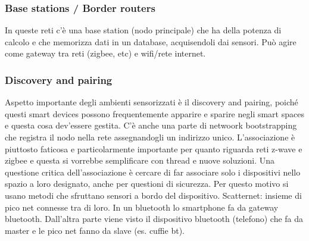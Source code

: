 \subsubsection{Base stations / Border routers}
In queste reti c'è una base station (nodo principale) che ha della potenza di calcolo e che memorizza dati in un database, acquisendoli dai sensori. Può agire come gateway tra reti (zigbee, etc) e wifi/rete internet.


\subsubsection{Discovery and pairing}
Aspetto importante degli ambienti sensorizzati è il discovery and pairing, poiché questi smart devices possono frequentemente apparire e sparire negli smart spaces e questa cosa dev'essere gestita. C'è anche una parte di netwoork bootstrapping che registra il nodo nella rete assegnandogli un indirizzo unico. L'associazione è piuttosto faticosa e particolarmente importante per quanto riguarda reti z-wave e zigbee e questa si vorrebbe semplificare con thread e nuove soluzioni. Una questione critica dell'associazione è cercare di far associare solo i dispositivi nello spazio a loro designato, anche per questioni di sicurezza. Per questo motivo si usano metodi che sfruttano sensori a bordo del dispositivo.
Scatternet: insieme di pico net connesse tra di loro. In un bluetooth lo smartphone fa da gateway bluetooth. Dall'altra parte viene visto il dispositivo bluetooth (telefono) che fa da master e le pico net fanno da slave (es. cuffie bt).


